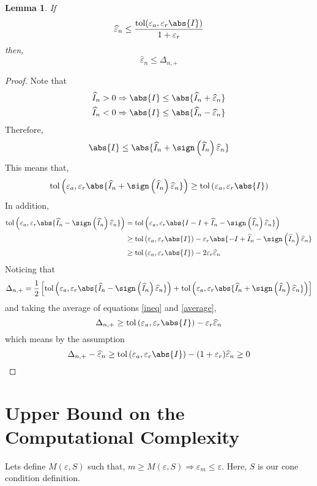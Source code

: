 \documentclass[]{elsarticle}
\newtheorem{lem}{Lemma}
\theoremstyle{definition}
\newcommand{\tol}{\text{tol}}
\begin{document}
\begin{lem}\label{second}
If
\[
\widehat{\varepsilon}_n\leq \frac{\tol(\varepsilon_a,\varepsilon_r\abs{I})}{1+\varepsilon_r}
\]
then,
\[
\widehat{\varepsilon}_n\leq \Delta_{n,+}
\]
\end{lem}
\begin{proof}
Note that
\begin{align*}
&\widehat{I}_n>0\Rightarrow\abs{I}\leq \abs{\widehat{I}_n+\widehat{\varepsilon}_n}\\
&\widehat{I}_n<0\Rightarrow\abs{I}\leq \abs{\widehat{I}_n-\widehat{\varepsilon}_n}
\end{align*}
Therefore,
\[
\abs{I}\leq \abs{\widehat{I}_n+\sign\left(\widehat{I}_n\right)\widehat{\varepsilon}_n}
\]
This means that,
\begin{equation}\label{ineq}
\tol\left(\varepsilon_a,\varepsilon_r\abs{\widehat{I}_n+\sign\left(\widehat{I}_n\right)\widehat{\varepsilon}_n}\right)\geq \tol\left(\varepsilon_a,\varepsilon_r\abs{I}\right)
\end{equation}
In addition,
\begin{align}
\tol\left(\varepsilon_a,\varepsilon_r\abs{\widehat{I}_n-\sign\left(\widehat{I}_n\right)\widehat{\varepsilon}_n}\right)
& =\tol\left(\varepsilon_a,\varepsilon_r\abs{I-I+\widehat{I}_n-\sign\left(\widehat{I}_n\right)\widehat{\varepsilon}_n}\right)\\
& \geq \tol\left(\varepsilon_a,\varepsilon_r\abs{I}\right)-\varepsilon_r\abs{-I+\widehat{I}_n-\sign\left(\widehat{I}_n\right)\widehat{\varepsilon}_n} \\
& \geq \tol\left(\varepsilon_a,\varepsilon_r\abs{I}\right)-2\varepsilon_r\widehat{\varepsilon}_n \label{average}
\end{align}
Noticing that
\[
\Delta_{n,+}=\frac 1 2 \left[ \tol\left(\varepsilon_a,\varepsilon_r\abs{\widehat{I}_n-\sign\left(\widehat{I}_n\right)\widehat{\varepsilon}_n}\right) + \tol\left(\varepsilon_a,\varepsilon_r\abs{\widehat{I}_n+\sign\left(\widehat{I}_n\right)\widehat{\varepsilon}_n}\right) \right]
\]
and taking the average of equations \eqref{ineq} and \eqref{average},
\[
\Delta_{n,+}\geq \tol\left(\varepsilon_a,\varepsilon_r\abs{I}\right)-\varepsilon_r\widehat{\varepsilon}_n
\]
which means by the assumption
\[
\Delta_{n,+} - \widehat{\varepsilon}_n \geq \tol\left(\varepsilon_a,\varepsilon_r\abs{I}\right)-(1+\varepsilon_r)\widehat{\varepsilon}_n\geq 0
\]
\end{proof}

\section{Upper Bound on the Computational Complexity}
Lets define $M(\varepsilon,S)$ such that, $m\geq M(\varepsilon,S)\Rightarrow {\varepsilon}_m\leq \varepsilon$. Here, $S$ is our cone condition definition.
\end{document}

